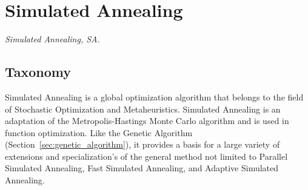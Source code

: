 

\section{Simulated Annealing} 
\label{sec:simulated_annealing}

\emph{Simulated Annealing, SA.}

\subsection{Taxonomy}
Simulated Annealing is a global optimization algorithm that belongs to the field of Stochastic Optimization and Metaheuristics.
Simulated Annealing is an adaptation of the Metropolis-Hastings Monte Carlo algorithm and is used in function optimization. Like the Genetic Algorithm (Section~\ref{sec:genetic_algorithm}), it provides a basis for a large variety of extensions and specialization's of the general method not limited to Parallel Simulated Annealing, Fast Simulated Annealing, and Adaptive Simulated Annealing.

